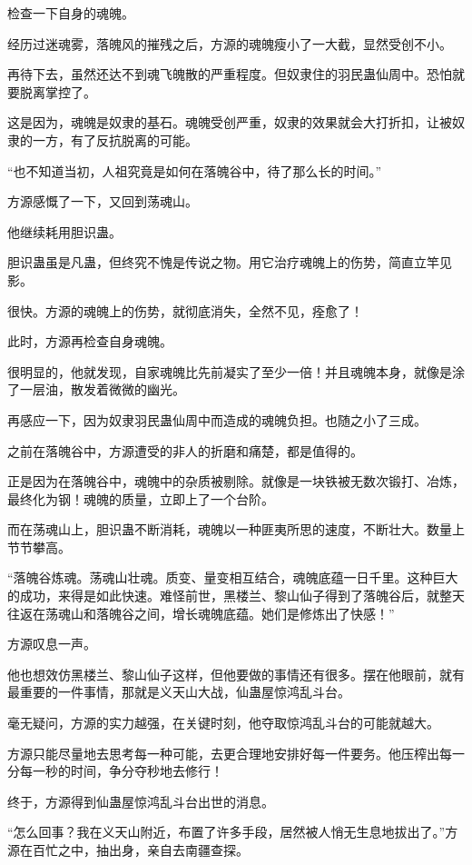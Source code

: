 \begin{this_body}
检查一下自身的魂魄。

经历过迷魂雾，落魄风的摧残之后，方源的魂魄瘦小了一大截，显然受创不小。

再待下去，虽然还达不到魂飞魄散的严重程度。但奴隶住的羽民蛊仙周中。恐怕就要脱离掌控了。

这是因为，魂魄是奴隶的基石。魂魄受创严重，奴隶的效果就会大打折扣，让被奴隶的一方，有了反抗脱离的可能。

“也不知道当初，人祖究竟是如何在落魄谷中，待了那么长的时间。”

方源感慨了一下，又回到荡魂山。

他继续耗用胆识蛊。

胆识蛊虽是凡蛊，但终究不愧是传说之物。用它治疗魂魄上的伤势，简直立竿见影。

很快。方源的魂魄上的伤势，就彻底消失，全然不见，痊愈了！

此时，方源再检查自身魂魄。

很明显的，他就发现，自家魂魄比先前凝实了至少一倍！并且魂魄本身，就像是涂了一层油，散发着微微的幽光。

再感应一下，因为奴隶羽民蛊仙周中而造成的魂魄负担。也随之小了三成。

之前在落魄谷中，方源遭受的非人的折磨和痛楚，都是值得的。

正是因为在落魄谷中，魂魄中的杂质被剔除。就像是一块铁被无数次锻打、冶炼，最终化为钢！魂魄的质量，立即上了一个台阶。

而在荡魂山上，胆识蛊不断消耗，魂魄以一种匪夷所思的速度，不断壮大。数量上节节攀高。

“落魄谷炼魂。荡魂山壮魂。质变、量变相互结合，魂魄底蕴一日千里。这种巨大的成功，来得是如此快速。难怪前世，黑楼兰、黎山仙子得到了落魄谷后，就整天往返在荡魂山和落魄谷之间，增长魂魄底蕴。她们是修炼出了快感！”

方源叹息一声。

他也想效仿黑楼兰、黎山仙子这样，但他要做的事情还有很多。摆在他眼前，就有最重要的一件事情，那就是义天山大战，仙蛊屋惊鸿乱斗台。

毫无疑问，方源的实力越强，在关键时刻，他夺取惊鸿乱斗台的可能就越大。

方源只能尽量地去思考每一种可能，去更合理地安排好每一件要务。他压榨出每一分每一秒的时间，争分夺秒地去修行！

终于，方源得到仙蛊屋惊鸿乱斗台出世的消息。

“怎么回事？我在义天山附近，布置了许多手段，居然被人悄无生息地拔出了。”方源在百忙之中，抽出身，亲自去南疆查探。


\end{this_body}

